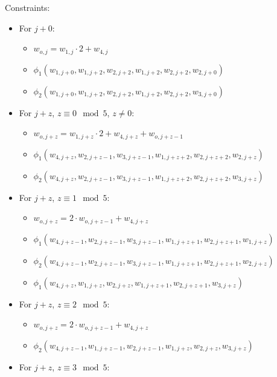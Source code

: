 Constraints:
\begin{itemize}
    \item For $j + 0$:
    \begin{itemize}
        \item $w_{o, j} = w_{1, j} \cdot 2 + w_{4, j}$
        \item $\phi_1(w_{1, j + 0}, w_{1, j + 2}, w_{2, j + 2}, w_{1, j + 2}, w_{2, j + 2}, w_{2, j + 0})$
        \item $\phi_2(w_{1, j + 0}, w_{1, j + 2}, w_{2, j + 2}, w_{1, j + 2}, w_{2, j + 2}, w_{3, j + 0})$
    \end{itemize}
    \item For $j + z$, $z \equiv 0 \mod 5$, $z \neq 0$:
    \begin{itemize}
        \item $w_{o, j + z} = w_{1, j + z} \cdot 2 + w_{4, j + z} + w_{o, j + z - 1}$
        \item $\phi_1(w_{4, j + z}, w_{2, j + z - 1}, w_{3, j + z - 1}, w_{1, j + z + 2}, w_{2, j + z + 2}, w_{2, j + z})$
        \item $\phi_2(w_{4, j + z}, w_{2, j + z - 1}, w_{3, j + z - 1}, w_{1, j + z + 2}, w_{2, j + z + 2}, w_{3, j + z})$
    \end{itemize}
    \item For $j + z$, $z \equiv 1 \mod 5$:
    \begin{itemize}
        \item $w_{o, j + z} = 2 \cdot w_{o, j + z - 1} + w_{4, j + z}$
        \item $\phi_1(w_{4, j + z - 1}, w_{2, j + z - 1}, w_{3, j + z - 1}, w_{1, j + z + 1}, w_{2, j + z + 1}, w_{1, j + z})$
        \item $\phi_2(w_{4, j + z - 1}, w_{2, j + z - 1}, w_{3, j + z - 1}, w_{1, j + z + 1}, w_{2, j + z + 1}, w_{2, j + z})$
        \item $\phi_1(w_{4, j + z }, w_{1, j + z }, w_{2, j + z }, w_{1, j + z + 1}, w_{2, j + z + 1}, w_{3, j + z})$
    \end{itemize}
    \item For $j + z$, $z \equiv 2 \mod 5$:
    \begin{itemize}
        \item $w_{o, j + z} = 2 \cdot w_{o, j + z - 1} + w_{4, j + z}$
        \item $\phi_2(w_{4, j + z - 1}, w_{1, j + z - 1}, w_{2, j + z - 1}, w_{1, j + z}, w_{2, j + z}, w_{3, j + z})$
    \end{itemize}
    \item For $j + z$, $z \equiv 3 \mod 5$:

\end{itemize}
